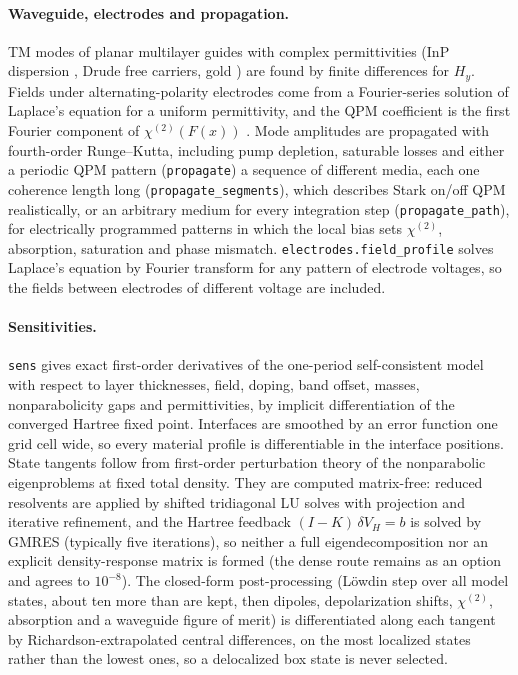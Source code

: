 \documentclass[11pt]{article}
\newcommand{\chitwo}{\chi^{(2)}}
\newcommand{\code}[1]{\texttt{#1}}
\begin{document}
\paragraph{Waveguide, electrodes and propagation.} TM modes of planar multilayer guides with complex permittivities (InP dispersion \cite{Pettit1965}, Drude free carriers, gold \cite{Ordal1985}) are found by finite differences for $H_y$. Fields under alternating-polarity electrodes come from a Fourier-series solution of Laplace's equation for a uniform permittivity, and the QPM coefficient is the first Fourier component of $\chitwo(F(x))$ \cite{Fejer1992}. Mode amplitudes are propagated with fourth-order Runge--Kutta, including pump depletion, saturable losses and either a periodic QPM pattern (\code{propagate}) a sequence of different media, each one coherence length long (\code{propagate\_segments}), which describes Stark on/off QPM realistically, or an arbitrary medium for every integration step (\code{propagate\_path}), for electrically programmed patterns in which the local bias sets $\chitwo$, absorption, saturation and phase mismatch. \code{electrodes.field\_profile} solves Laplace's equation by Fourier transform for any pattern of electrode voltages, so the fields between electrodes of different voltage are included.

\paragraph{Sensitivities.} \code{sens} gives exact first-order derivatives of the one-period self-consistent model with respect to layer thicknesses, field, doping, band offset, masses, nonparabolicity gaps and permittivities, by implicit differentiation of the converged Hartree fixed point. Interfaces are smoothed by an error function one grid cell wide, so every material profile is differentiable in the interface positions. State tangents follow from first-order perturbation theory of the nonparabolic eigenproblems at fixed total density. They are computed matrix-free: reduced resolvents are applied by shifted tridiagonal LU solves with projection and iterative refinement, and the Hartree feedback $(I-K)\,\delta V_H=b$ is solved by GMRES (typically five iterations), so neither a full eigendecomposition nor an explicit density-response matrix is formed (the dense route remains as an option and agrees to $10^{-8}$). The closed-form post-processing (L\"owdin step over all model states, about ten more than are kept, then dipoles, depolarization shifts, $\chitwo$, absorption and a waveguide figure of merit) is differentiated along each tangent by Richardson-extrapolated central differences, on the most localized states rather than the lowest ones, so a delocalized box state is never selected.
\end{document}

